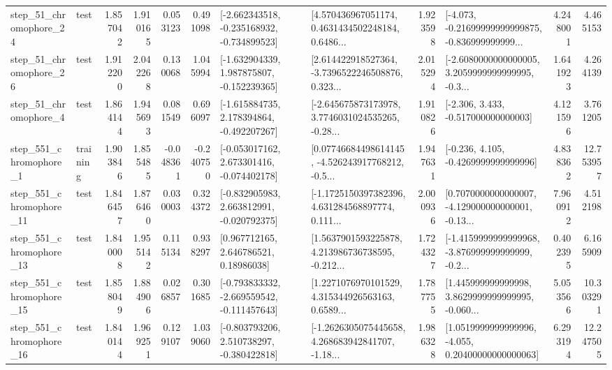 \begin{tabular}{llrrrrllrlrr}
   step\_51\_chromophore\_24 &      test &      1.857042 &    1.910165 &      0.053123 &  0.491098 &  [-2.662343518, -0.235168932, -0.734899523] &  [4.570436967051174, 0.4631434502248184, 0.6486... &       1.923598 &  [-4.073, -0.21699999999999875, -0.836999999999... &            4.248001 &          4.465153 \\
   step\_51\_chromophore\_26 &      test &      1.912200 &    2.042268 &      0.130068 &  1.045994 &   [-1.632904339, 1.987875807, -0.152239365] &  [2.614422918527364, -3.7396522246508876, 0.323... &       2.015294 &  [-2.6080000000000005, 3.2059999999999995, -0.3... &            1.641923 &          4.264139 \\
    step\_51\_chromophore\_4 &      test &      1.864144 &    1.945693 &      0.081549 &  0.696097 &   [-1.615884735, 2.178394864, -0.492207267] &  [-2.645675873173978, 3.7746031024535265, -0.28... &       1.910826 &                [-2.306, 3.433, -0.517000000000003] &            4.121596 &          3.761205 \\
   step\_551\_chromophore\_1 &  training &      1.903846 &    1.855485 &     -0.048361 & -0.240750 &   [-0.053017162, 2.673301416, -0.074402178] &  [0.07746684498614145, -4.526243917768212, -0.5... &       1.947631 &               [-0.236, 4.105, -0.4269999999999996] &            4.838362 &         12.753957 \\
  step\_551\_chromophore\_11 &      test &      1.846457 &    1.876460 &      0.030003 &  0.324372 &   [-0.832905983, 2.663812991, -0.020792375] &  [-1.1725150397382396, 4.631284568897774, 0.111... &       2.000936 &  [0.7070000000000007, -4.129000000000001, -0.13... &            7.960912 &          4.512198 \\
  step\_551\_chromophore\_13 &      test &      1.840008 &    1.955142 &      0.115134 &  0.938297 &      [0.967712165, 2.646786521, 0.18986038] &  [1.5637901593225878, 4.213986736738595, -0.212... &       1.724327 &  [-1.4159999999999968, -3.876999999999999, -0.2... &            0.402395 &          6.165909 \\
  step\_551\_chromophore\_15 &      test &      1.858049 &    1.884906 &      0.026857 &  0.301685 &  [-0.793833332, -2.669559542, -0.111457643] &  [1.2271076970101529, 4.315344926563163, 0.6589... &       1.787755 &  [1.445999999999998, 3.8629999999999995, -0.060... &            5.053566 &         10.303291 \\
  step\_551\_chromophore\_16 &      test &      1.840144 &    1.969251 &      0.129107 &  1.039060 &   [-0.803793206, 2.510738297, -0.380422818] &  [-1.2626305075445658, 4.268683942841707, -1.18... &       1.986328 &  [1.0519999999999996, -4.055, 0.20400000000000063] &            6.293194 &         12.247505 \\

\end{tabular}
